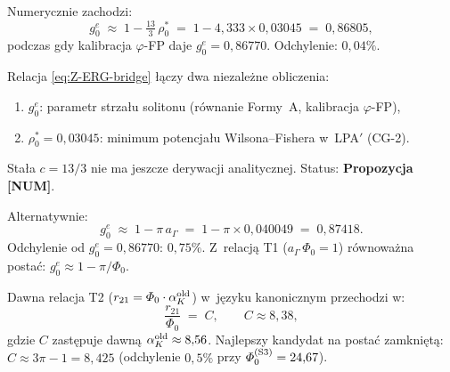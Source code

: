 \begin{proposition}
\label{prop:Z-ERG-bridge}
Numerycznie zachodzi:
\begin{equation}\label{eq:Z-ERG-bridge}
  g_0^e \;\approx\; 1 - \tfrac{13}{3}\,\rho_0^*
  \;=\; 1 - 4{,}333 \times 0{,}03045
  \;=\; 0{,}86805,
\end{equation}
podczas gdy kalibracja $\varphi$-FP daje $g_0^e = 0{,}86770$.
Odchylenie: $0{,}04\%$.

\medskip\noindent
Relacja \eqref{eq:Z-ERG-bridge} \l{}\k{a}czy dwa niezale\.zne
obliczenia:
\begin{enumerate}[nosep]
  \item $g_0^e$: parametr strza\l{}u solitonu
    (r\'ownanie Formy~A, kalibracja $\varphi$-FP),
  \item $\rho_0^* = 0{,}03045$: minimum potencja\l{}u
    Wilsona--Fishera w~LPA$'$ (CG-2).
\end{enumerate}
Sta\l{}a $c = 13/3$ nie ma jeszcze derywacji analitycznej.
Status: \textbf{Propozycja [NUM]}.
\end{proposition}

\begin{proposition}
\label{prop:Z-substrate-bridge}
Alternatywnie:
\begin{equation}\label{eq:Z-substrate-bridge}
  g_0^e \;\approx\; 1 - \pi\,a_\Gamma
  \;=\; 1 - \pi \times 0{,}040049
  \;=\; 0{,}87418.
\end{equation}
Odchylenie od $g_0^e = 0{,}86770$: $0{,}75\%$.
Z~relacj\k{a} T1 ($a_\Gamma\,\Phi_0 = 1$) r\'ownowa\.zna posta\'c:
$g_0^e \approx 1 - \pi/\Phi_0$.
\end{proposition}

\begin{proposition}
\label{prop:Z-T2-canonical}
Dawna relacja T2 ($r_{21} = \Phi_0 \cdot \alpha_K^{\rm old}$)
w~j\k{e}zyku kanonicznym przechodzi w:
\begin{equation}\label{eq:Z-T2-canonical}
  \frac{r_{21}}{\Phi_0} \;=\; C,
  \qquad C \approx 8{,}38,
\end{equation}
gdzie $C$ zast\k{e}puje dawn\k{a} $\alpha_K^{\rm old} \approx 8{,}56$.
Najlepszy kandydat na posta\'c zamkni\k{e}t\k{a}: $C \approx 3\pi - 1 = 8{,}425$
(odchylenie $0{,}5\%$ przy $\Phi_0^{(\rm S3)} = 24{,}67$).
\end{proposition}

